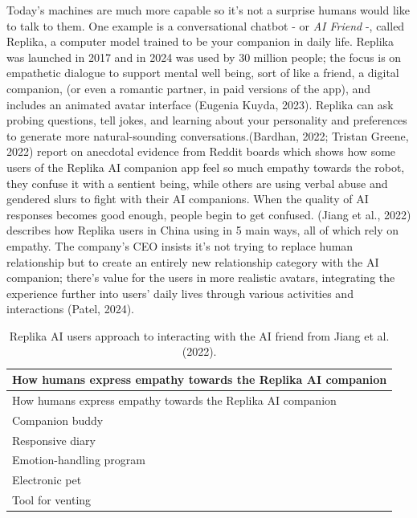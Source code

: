 \documentclass[
  letterpaper,
  DIV=11,
  numbers=noendperiod]{scrartcl}
\begin{document}
Today's machines are much more capable so it's not a surprise humans
would like to talk to them. One example is a conversational chatbot - or
\emph{AI Friend} -, called Replika, a computer model trained to be your
companion in daily life. Replika was launched in 2017 and in 2024 was
used by 30 million people; the focus is on empathetic dialogue to
support mental well being, sort of like a friend, a digital companion,
(or even a romantic partner, in paid versions of the app), and includes
an animated avatar interface (Eugenia Kuyda, 2023). Replika can ask
probing questions, tell jokes, and learning about your personality and
preferences to generate more natural-sounding conversations.(Bardhan,
2022; Tristan Greene, 2022) report on anecdotal evidence from Reddit
boards which shows how some users of the Replika AI companion app feel
so much empathy towards the robot, they confuse it with a sentient
being, while others are using verbal abuse and gendered slurs to fight
with their AI companions. When the quality of AI responses becomes good
enough, people begin to get confused. (Jiang et al., 2022) describes how
Replika users in China using in 5 main ways, all of which rely on
empathy. The company's CEO insists it's not trying to replace human
relationship but to create an entirely new relationship category with
the AI companion; there's value for the users in more realistic avatars,
integrating the experience further into users' daily lives through
various activities and interactions (Patel, 2024).

\begin{longtable}[]{@{}l@{}}
\caption{Replika AI users approach to interacting with the AI friend
from Jiang et al. (2022).}\tabularnewline
\toprule\noalign{}
How humans express empathy towards the Replika AI companion \\
\midrule\noalign{}
\endfirsthead
\toprule\noalign{}
How humans express empathy towards the Replika AI companion \\
\midrule\noalign{}
\endhead
\bottomrule\noalign{}
\endlastfoot
Companion buddy \\
Responsive diary \\
Emotion-handling program \\
Electronic pet \\
Tool for venting \\
\end{longtable}
\end{document}
